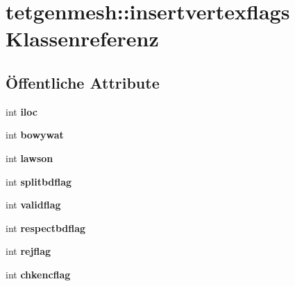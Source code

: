\hypertarget{classtetgenmesh_1_1insertvertexflags}{\section{tetgenmesh\-:\-:insertvertexflags Klassenreferenz}
\label{classtetgenmesh_1_1insertvertexflags}
}
\subsection*{Öffentliche Attribute}
\begin{DoxyCompactItemize}
\item 
\hypertarget{classtetgenmesh_1_1insertvertexflags_a6d81dd1549cf9d39ce289d674ce68f45}{int {\bfseries iloc}}\label{classtetgenmesh_1_1insertvertexflags_a6d81dd1549cf9d39ce289d674ce68f45}

\item 
\hypertarget{classtetgenmesh_1_1insertvertexflags_a9b0fa5e802abd84a76e7e24c2dd448ac}{int {\bfseries bowywat}}\label{classtetgenmesh_1_1insertvertexflags_a9b0fa5e802abd84a76e7e24c2dd448ac}

\item 
\hypertarget{classtetgenmesh_1_1insertvertexflags_a932694f9cfa9b5a20d3ee632c5cb4f0b}{int {\bfseries lawson}}\label{classtetgenmesh_1_1insertvertexflags_a932694f9cfa9b5a20d3ee632c5cb4f0b}

\item 
\hypertarget{classtetgenmesh_1_1insertvertexflags_a38c4259fdc1e73ee994d4bd424e32b2e}{int {\bfseries splitbdflag}}\label{classtetgenmesh_1_1insertvertexflags_a38c4259fdc1e73ee994d4bd424e32b2e}

\item 
\hypertarget{classtetgenmesh_1_1insertvertexflags_a22ee846cb6922a83892692ed5a31c632}{int {\bfseries validflag}}\label{classtetgenmesh_1_1insertvertexflags_a22ee846cb6922a83892692ed5a31c632}

\item 
\hypertarget{classtetgenmesh_1_1insertvertexflags_ae953afe4a3a59188b59fabe96cfe1d47}{int {\bfseries respectbdflag}}\label{classtetgenmesh_1_1insertvertexflags_ae953afe4a3a59188b59fabe96cfe1d47}

\item 
\hypertarget{classtetgenmesh_1_1insertvertexflags_af0c3e729085371144fd64069dc88d0ca}{int {\bfseries rejflag}}\label{classtetgenmesh_1_1insertvertexflags_af0c3e729085371144fd64069dc88d0ca}

\item 
\hypertarget{classtetgenmesh_1_1insertvertexflags_a5751fba3e53f3be9d826f9fc96b180a4}{int {\bfseries chkencflag}}\label{classtetgenmesh_1_1insertvertexflags_a5751fba3e53f3be9d826f9fc96b180a4}


\end{DoxyCompactItemize}
